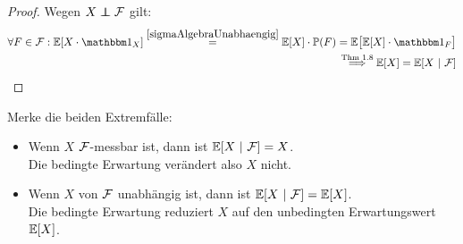 \begin{proof}
Wegen $X\unab\F$ gilt:
\begin{align*}
\forall F\in\F:\E[X\cdot\indi_X]
\stackeq{\ref{sigmaAlgebraUnabhaengig}}
\E[X]\cdot\P(F)=\E\big[\E[X]\cdot\indi_F\big]\\
\stackrel{\text{Thm 1.8}}{\Longrightarrow}
\E[X]=\E[X~|~\F]
\end{align*}
\end{proof}

\begin{bemerkung}
Merke die beiden Extremfälle:
\begin{itemize}
\item Wenn $X$ $\mathcal{F}$-messbar ist, dann ist $\mathbb{E}[X~|~\mathcal{F}]=X$.\\
Die bedingte Erwartung verändert also $X$ nicht.
\item Wenn $X$ von $\mathcal{F}$ unabhängig ist, dann ist $\mathbb{E}[X~|~\mathcal{F}]=\mathbb{E}[X]$.\\
Die bedingte Erwartung reduziert $X$ auf den unbedingten Erwartungswert $\mathbb{E}[X]$.
\end{itemize}
\end{bemerkung}
